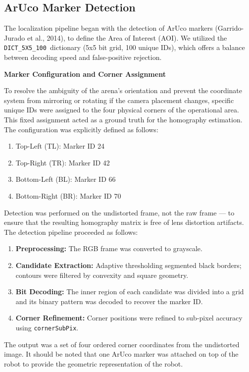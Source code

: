 \subsection{ArUco Marker Detection}
\label{sec:3.4.1}
The localization pipeline began with the detection of ArUco markers (Garrido-Jurado et al., 2014),  to define the Area of Interest (AOI). We utilized the \verb|DICT_5X5_100 |dictionary (5x5 bit grid, 100 unique IDs), which offers a balance between decoding speed and false-positive rejection.

\noindent\textbf{Marker Configuration and Corner Assignment}

To resolve the ambiguity of the arena’s orientation and prevent the coordinate system from mirroring or rotating if the camera placement changes, specific unique IDs were assigned to the four physical corners of the operational area. This fixed assignment acted as a ground truth for the homography estimation. The configuration was explicitly defined as follows:
\begin{enumerate}
    \item Top-Left (TL): Marker ID 24
    \item Top-Right (TR): Marker ID 42
    \item Bottom-Left (BL): Marker ID 66
    \item Bottom-Right (BR): Marker ID 70
\end{enumerate}

Detection was performed on the undistorted frame, not the raw frame — to ensure that
the resulting homography matrix is free of lens distortion artifacts. The detection pipeline
proceeded as follows:

\begin{enumerate}
    \item \textbf{Preprocessing:} The RGB frame was converted to grayscale.
    \item \textbf{Candidate Extraction:} Adaptive thresholding segmented black borders;
          contours were filtered by convexity and square geometry.
    \item \textbf{Bit Decoding:} The inner region of each candidate was divided into a
          grid and its binary pattern was decoded to recover the marker ID.
    \item \textbf{Corner Refinement:} Corner positions were refined to sub-pixel accuracy
          using \texttt{cornerSubPix}.
\end{enumerate}

The output was a set of four ordered corner coordinates from the undistorted image. It should be noted that one ArUco marker was attached on top of the robot to provide the geometric representation of the robot.

